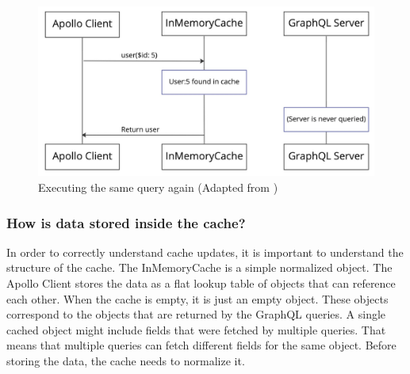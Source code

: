 \ifshowImages
\begin{figure}[H]
    \centering
    \includegraphics[width=0.6\linewidth]{images/background/apollo/apollo-client-basic-cache-warm.jpeg}
    \caption{Executing the same query again (Adapted from \cite{misc:-:background:graphql:apollo-client-cache-overview})}\label{fig:background:graphql:user-query-second-time}
\end{figure}
\fi

\subsubsection{How is data stored inside the cache?}

In order to correctly understand cache updates, it is important to understand the structure of the cache. The InMemoryCache is a simple normalized object. The Apollo Client stores the data as a flat lookup table of objects that can reference each other. When the cache is empty, it is just an empty object. These objects correspond to the objects that are returned by the GraphQL queries. A single cached object might include fields that were fetched by multiple queries. That means that multiple queries can fetch different fields for the same object. Before storing the data, the cache needs to normalize it. \cite{misc:-:background:graphql:apollo-client-cache-overview}





